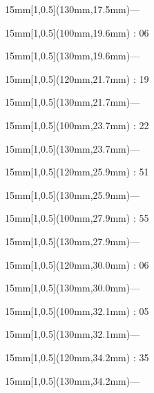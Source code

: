 \documentclass[a4paper]{memoir}
\begin{document}
\begin{textblock*}{15mm}[1,0.5](130mm,17.5mm)\flushright —\end{textblock*}
\begin{textblock*}{15mm}[1,0.5](100mm,19.6mm) : 06\end{textblock*}
\begin{textblock*}{15mm}[1,0.5](130mm,19.6mm)\flushright —\end{textblock*}
\begin{textblock*}{15mm}[1,0.5](120mm,21.7mm) : 19\end{textblock*}
\begin{textblock*}{15mm}[1,0.5](130mm,21.7mm)\flushright —\end{textblock*}
\begin{textblock*}{15mm}[1,0.5](100mm,23.7mm) : 22\end{textblock*}
\begin{textblock*}{15mm}[1,0.5](130mm,23.7mm)\flushright —\end{textblock*}
\begin{textblock*}{15mm}[1,0.5](120mm,25.9mm) : 51\end{textblock*}
\begin{textblock*}{15mm}[1,0.5](130mm,25.9mm)\flushright —\end{textblock*}
\begin{textblock*}{15mm}[1,0.5](100mm,27.9mm) : 55\end{textblock*}
\begin{textblock*}{15mm}[1,0.5](130mm,27.9mm)\flushright —\end{textblock*}
\begin{textblock*}{15mm}[1,0.5](120mm,30.0mm) : 06\end{textblock*}
\begin{textblock*}{15mm}[1,0.5](130mm,30.0mm)\flushright —\end{textblock*}
\begin{textblock*}{15mm}[1,0.5](100mm,32.1mm) : 05\end{textblock*}
\begin{textblock*}{15mm}[1,0.5](130mm,32.1mm)\flushright —\end{textblock*}
\begin{textblock*}{15mm}[1,0.5](120mm,34.2mm) : 35\end{textblock*}
\begin{textblock*}{15mm}[1,0.5](130mm,34.2mm)\flushright —\end{textblock*}
\end{document}
